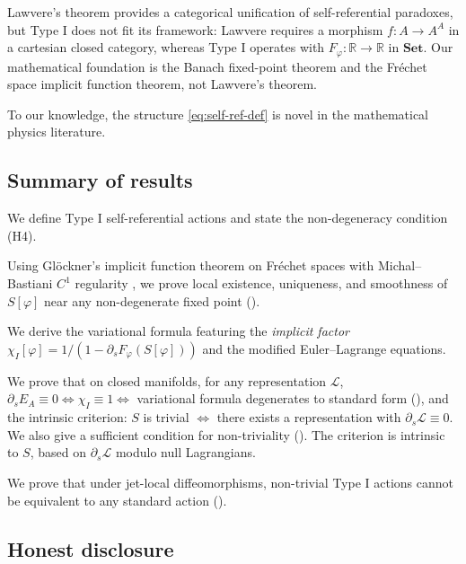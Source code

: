 \documentclass[12pt,letterpaper]{article}
\theoremstyle{definition}
\newcommand{\mL}{\mathcal{L}}
\newcommand{\R}{\mathbb{R}}
\begin{document}
Lawvere's theorem provides a categorical unification of self-referential paradoxes, but Type I does not fit its framework: Lawvere requires a morphism $f: A \to A^A$ in a cartesian closed category, whereas Type I operates with $F_\varphi: \R \to \R$ in $\mathbf{Set}$. Our mathematical foundation is the Banach fixed-point theorem and the Fr\'echet space implicit function theorem, not Lawvere's theorem.

To our knowledge, the structure \eqref{eq:self-ref-def} is novel in the mathematical physics literature.

\subsection{Summary of results}

\begin{description}[leftmargin=*]
\item[Definition (\Cref{sec:def})] We define Type I self-referential actions and state the non-degeneracy condition (H4).
\item[Existence (\Cref{sec:existence})] Using Gl\"ockner's implicit function theorem on Fr\'echet spaces \cite{Glockner2006} with Michal--Bastiani $C^1$ regularity \cite{Hamilton1982}, we prove local existence, uniqueness, and smoothness of $S[\varphi]$ near any non-degenerate fixed point ().
\item[Variational principle (\Cref{sec:variational})] We derive the variational formula featuring the \emph{implicit factor} $\chi_I[\varphi] = 1/(1 - \partial_s F_\varphi(S[\varphi]))$ and the modified Euler--Lagrange equations.
\item[Non-triviality (\Cref{sec:nontriv})] We prove that on closed manifolds, for any representation $\mL$, $\partial_s E_A \equiv 0 \iff \chi_I \equiv 1 \iff$ variational formula degenerates to standard form (), and the intrinsic criterion: $S$ is trivial $\iff$ there exists a representation with $\partial_s \mL \equiv 0$. We also give a sufficient condition for non-triviality (). The criterion is intrinsic to $S$, based on $\partial_s\mathcal{L}$ modulo null Lagrangians.
\item[Categorical non-equivalence (\Cref{sec:cat})] We prove that under jet-local diffeomorphisms, non-trivial Type I actions cannot be equivalent to any standard action ().
\end{description}

\subsection{Honest disclosure}
\label{sec:disclosure}
\end{document}
